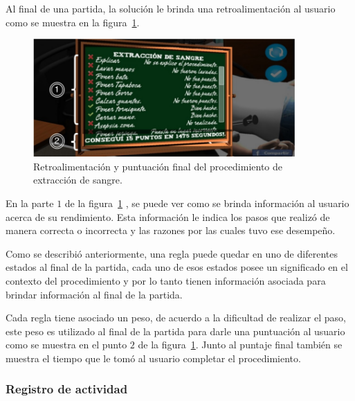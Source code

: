 Al final de una partida, la solución le brinda una retroalimentación al 
usuario como se muestra en la figura~\ref{fig:hemocultivo_retroalimentacion}.

\begin{figure}[H]
\centering 
\includegraphics[width=10cm]{solucion/images/hemocultivo_retroalimentacion.jpg}
\caption{Retroalimentación y puntuación final del procedimiento de extracción de sangre.}
\label{fig:hemocultivo_retroalimentacion}
\end{figure}

En la parte $1$ de la figura~\ref{fig:hemocultivo_retroalimentacion} , se puede ver 
como se brinda información al  usuario acerca de su rendimiento. Esta información le 
indica los pasos que realizó de manera correcta o incorrecta y las razones por las 
cuales tuvo ese desempeño.

Como se describió anteriormente, una regla puede quedar en uno de diferentes
estados al final de la partida, cada uno de esos estados posee un significado en
el contexto del procedimiento y por lo tanto tienen información asociada para
brindar información al final de la partida.

Cada regla tiene asociado un peso, de acuerdo a la dificultad de realizar el
paso, este peso es utilizado al final de la partida para darle una puntuación al
usuario como se muestra en el punto $2$ de la
figura~\ref{fig:hemocultivo_retroalimentacion}. Junto al puntaje final también
se muestra el tiempo que le tomó al usuario completar el procedimiento.


\subsubsection{Registro de actividad}



